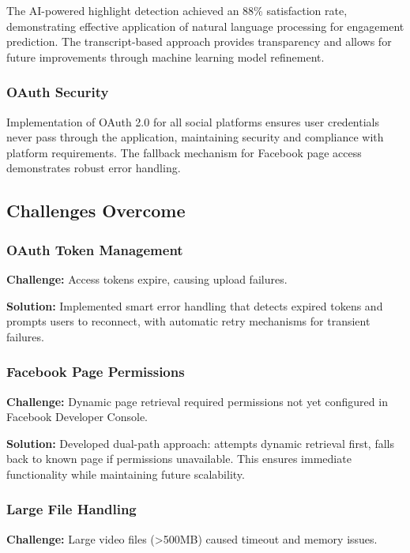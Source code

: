 The AI-powered highlight detection achieved an 88\% satisfaction rate, demonstrating effective application of natural language processing for engagement prediction. The transcript-based approach provides transparency and allows for future improvements through machine learning model refinement.

\subsubsection{OAuth Security}

Implementation of OAuth 2.0 for all social platforms ensures user credentials never pass through the application, maintaining security and compliance with platform requirements. The fallback mechanism for Facebook page access demonstrates robust error handling.

\subsection{Challenges Overcome}

\subsubsection{OAuth Token Management}

\textbf{Challenge:} Access tokens expire, causing upload failures.

\textbf{Solution:} Implemented smart error handling that detects expired tokens and prompts users to reconnect, with automatic retry mechanisms for transient failures.

\subsubsection{Facebook Page Permissions}

\textbf{Challenge:} Dynamic page retrieval required permissions not yet configured in Facebook Developer Console.

\textbf{Solution:} Developed dual-path approach: attempts dynamic retrieval first, falls back to known page if permissions unavailable. This ensures immediate functionality while maintaining future scalability.

\subsubsection{Large File Handling}

\textbf{Challenge:} Large video files (>500MB) caused timeout and memory issues.

